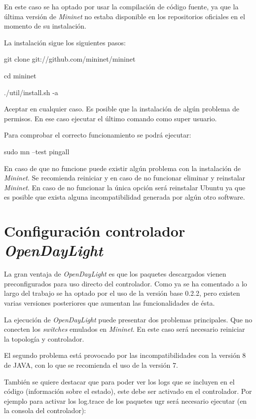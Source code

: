 \documentclass[a4paper,11pt]{book}
\begin{document}
En este caso se ha optado por usar la compilación de código fuente, ya que la última versión de \emph{Mininet} no estaba disponible en los repositorios oficiales en el momento de su instalación.

La instalación sigue los siguientes pasos:

\begin{python}
git clone git://github.com/mininet/mininet

cd mininet

./util/install.sh -a
\end{python}

Aceptar en cualquier caso. Es posible que la instalación de algún problema de permisos. En ese caso ejecutar el último comando como super usuario.

Para comprobar el correcto funcionamiento se podrá ejecutar:

\begin{python}
sudo mn --test pingall
\end{python}

En caso de que no funcione puede existir algún problema con la instalación de \emph{Mininet}. Se recomienda reiniciar y en caso de no funcionar eliminar y reinstalar \emph{Mininet}. En caso de no funcionar la única opción será reinstalar Ubuntu ya que es posible que exista alguna incompatibilidad generada por algún otro software.

\newpage
\section{Configuración controlador \emph{OpenDayLight}}\label{configODL}

La gran ventaja de \emph{OpenDayLight} es que los paquetes descargados vienen preconfigurados para uso directo del controlador. Como ya se ha comentado a lo largo del trabajo se ha optado por el uso de la versión base 0.2.2, pero existen varias versiones posteriores que aumentan las funcionalidades de ésta.

La ejecución de \emph{OpenDayLight} puede presentar dos problemas principales. Que no conecten los \textit{switches} emulados en \emph{Mininet}. En este caso será necesario reiniciar la topología y controlador.

El segundo problema está provocado por las incompatibilidades con la versión 8 de JAVA, con lo que se recomienda el uso de la versión 7.

También se quiere destacar que para poder ver los logs que se incluyen en el código (información sobre el estado), este debe ser activado en el controlador. Por ejemplo para activar los log.trace de los paquetes ugr será necesario ejecutar (en la consola del controlador):
\end{document}
